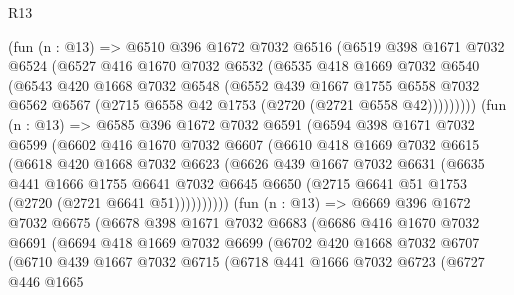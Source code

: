 \begin{lexlean}{R13}
\begin{coremodule}
        (fun (n : @13) =>
        @6510
          @396
          @1672
          @7032
          @6516
          (@6519
            @398
            @1671
            @7032
            @6524
            (@6527
              @416
              @1670
              @7032
              @6532
              (@6535
                @418
                @1669
                @7032
                @6540
                (@6543
                  @420
                  @1668
                  @7032
                  @6548
                  (@6552
                    @439
                    @1667
                    @1755
                    @6558
                    @7032
                    @6562
                    @6567
                    (@2715 @6558 @42 @1753 (@2720 (@2721 @6558 @42)))))))))
        (fun (n : @13) =>
        @6585
          @396
          @1672
          @7032
          @6591
          (@6594
            @398
            @1671
            @7032
            @6599
            (@6602
              @416
              @1670
              @7032
              @6607
              (@6610
                @418
                @1669
                @7032
                @6615
                (@6618
                  @420
                  @1668
                  @7032
                  @6623
                  (@6626
                    @439
                    @1667
                    @7032
                    @6631
                    (@6635
                      @441
                      @1666
                      @1755
                      @6641
                      @7032
                      @6645
                      @6650
                      (@2715 @6641 @51 @1753 (@2720 (@2721 @6641 @51))))))))))
        (fun (n : @13) =>
        @6669
          @396
          @1672
          @7032
          @6675
          (@6678
            @398
            @1671
            @7032
            @6683
            (@6686
              @416
              @1670
              @7032
              @6691
              (@6694
                @418
                @1669
                @7032
                @6699
                (@6702
                  @420
                  @1668
                  @7032
                  @6707
                  (@6710
                    @439
                    @1667
                    @7032
                    @6715
                    (@6718
                      @441
                      @1666
                      @7032
                      @6723
                      (@6727
                        @446
                        @1665

\end{coremodule}
\end{lexlean}
